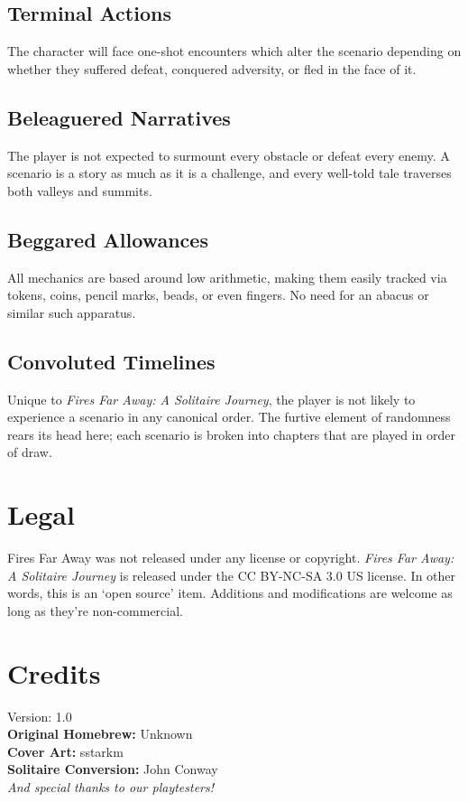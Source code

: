 \documentclass[12pt]{article}
\begin{document}
\begin{multicols*}{2}
\subsection*{Terminal Actions}
The character will face one-shot encounters which alter the scenario depending on whether they suffered defeat, conquered adversity, or fled in the face of it.

\subsection*{Beleaguered Narratives}
The player is not expected to surmount every obstacle or defeat every enemy. A scenario is a story as much as it is a challenge, and every well-told tale traverses both valleys and summits.

\subsection*{Beggared Allowances}
All mechanics are based around low arithmetic, making them easily tracked via tokens, coins, pencil marks, beads, or even fingers. No need for an abacus or similar such apparatus.

\subsection*{Convoluted Timelines}
Unique to \emph{Fires Far Away: A Solitaire Journey}, the player is not likely to experience a scenario in any canonical order. The furtive element of randomness rears its head here; each scenario is broken into chapters that are played in order of draw.


\vfill

\section*{Legal}
Fires Far Away was not released under any license or copyright. \emph{Fires Far Away: A Solitaire Journey} is released under the CC BY-NC-SA 3.0 US license. In other words, this is an ‘open source’ item. Additions and modifications are welcome as long as they’re non-commercial.

\section*{Credits}
Version: 1.0\\
\textbf{Original Homebrew:} Unknown\\
\textbf{Cover Art:} sstarkm\\
\textbf{Solitaire Conversion:} John Conway\\
\emph{And special thanks to our playtesters!}


\end{multicols*}
\end{document}
